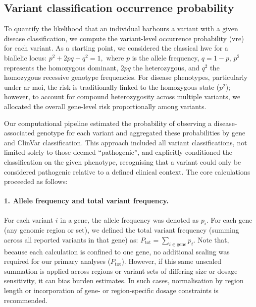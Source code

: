 \subsection{Variant classification occurrence probability}
To quantify the likelihood that an individual harbours a variant with a given disease classification, we compute the variant-level occurrence probability (\ac{vre}) for each variant.
As a starting point, we considered the classical \ac{hwe} for a biallelic locus:
$
p^2 + 2pq + q^2 = 1,
$
where \(p\) is the allele frequency, \(q = 1 - p\), \(p^2\) represents the homozygous dominant, \(2pq\) the heterozygous, and \(q^2\) the homozygous recessive genotype frequencies. For disease phenotypes, particularly under \ac{ar} \ac{moi}, the risk is traditionally linked to the homozygous state (\(p^2\)); however, to account for compound heterozygosity across multiple variants, %
we allocated the overall gene-level risk proportionally among variants.

Our computational pipeline estimated the probability of observing a disease-associated genotype for each variant and aggregated these probabilities by gene and ClinVar classification. This approach included all variant classifications, not limited solely to those deemed ``pathogenic'', and explicitly conditioned the classification on the given phenotype, recognising that a variant could only be considered pathogenic relative to a defined clinical context. The core calculations proceeded as follows:

\paragraph{1. Allele frequency and total variant frequency.} 
\label{sec:min_risk}
For each variant \(i\) in a gene, the allele frequency was denoted as \(p_i\). For each gene (any genomic region or set), we defined the total variant frequency (summing across all reported variants in that gene) as:
$P_{\text{tot}} = \sum_{i \in \text{gene}} p_i$.
Note that, because each calculation is confined to one gene, no additional scaling was required for our primary analyses (\(P_{\text{tot}}\)). However, if this same unscaled summation is applied across regions or variant sets of differing size or dosage sensitivity, it can bias burden estimates. In such cases, normalisation by region length or incorporation of gene- or region-specific dosage constraints is recommended.

